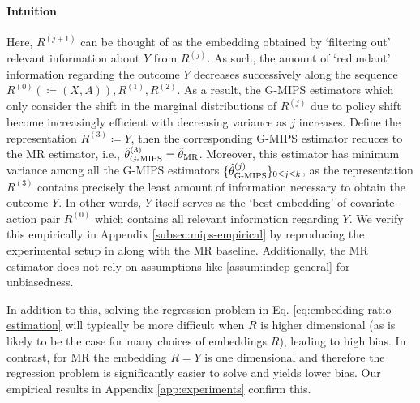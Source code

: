 \paragraph{Intuition}
Here, $R^{(j+1)}$ can be thought of as the embedding obtained by `filtering out' relevant information about $Y$ from $R^{(j)}$. As such, the amount of `redundant' information regarding the outcome $Y$ decreases successively along the sequence $R^{(0)} (\coloneqq (X, A)), R^{(1)}, R^{(2)}$. As a result, the G-MIPS estimators which only consider the shift in the marginal distributions of $R^{(j)}$ due to policy shift become increasingly efficient with decreasing variance as $j$ increases. Define the representation $R^{(3)} \coloneqq Y$, then the corresponding G-MIPS estimator reduces to the MR estimator, i.e., $\hat{\theta}^{(3)}_{\textup{G-MIPS}} = \hat{\theta}_{\textup{MR}}$. Moreover, this estimator has minimum variance among all the G-MIPS estimators $\{\hat{\theta}^{(j)}_{\textup{G-MIPS}}\}_{0\leq j\leq k}$, as the representation $R^{(3)}$ contains precisely the least amount of information necessary to obtain the outcome $Y$. In other words, $Y$ itself serves as the `best embedding' of covariate-action pair $R^{(0)}$ which contains all relevant information regarding $Y$. We verify this empirically in Appendix \ref{subsec:mips-empirical} by reproducing the experimental setup in \cite{saito2022off} along with the MR baseline. Additionally, the MR estimator does not rely on assumptions like \ref{assum:indep-general} for unbiasedness. 

In addition to this, solving the regression problem in Eq. \eqref{eq:embedding-ratio-estimation} will typically be more difficult when $R$ is higher dimensional (as is likely to be the case for many choices of embeddings $R$), leading to high bias. In contrast, for MR the embedding $R=Y$ is one dimensional and therefore the regression problem is significantly easier to solve and yields lower bias. Our empirical results in Appendix \ref{app:experiments} confirm this.

